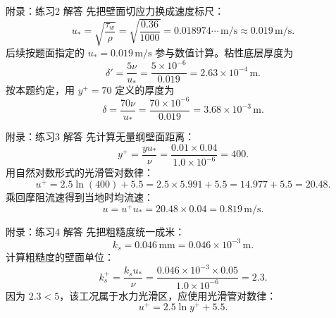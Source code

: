 \documentclass[aspectratio=169,10pt]{beamer}
\begin{document}
\begin{frame}{附录：练习2 解答}
  \label{A2}
  \footnotesize
  先把壁面切应力换成速度标尺：
  \[
    u_*=\sqrt{\frac{\tau_w}{\rho}}
    =\sqrt{\frac{0.36}{1000}}
    =0.018974\cdots\,\mathrm{m/s}
    \approx0.019\,\mathrm{m/s}.
    \tag{R49}
  \]
  后续按题面指定的 $u_*=0.019\,\mathrm{m/s}$ 参与数值计算。粘性底层厚度为
  \[
    \delta'=\frac{5\nu}{u_*}
    =\frac{5\times10^{-6}}{0.019}
    =2.63\times10^{-4}\,\mathrm m .
    \tag{R50}
  \]
  按本题约定，用 $y^+=70$ 定义的厚度为
  \[
    \delta=\frac{70\nu}{u_*}
    =\frac{70\times10^{-6}}{0.019}
    =3.68\times10^{-3}\,\mathrm m .
    \tag{R51}
  \]
\end{frame}

\begin{frame}{附录：练习3 解答}
  \label{A3}
  \footnotesize
  先计算无量纲壁面距离：
  \[
    y^+=\frac{yu_*}{\nu}
    =\frac{0.01\times0.04}{1.0\times10^{-6}}
    =400 .
    \tag{R52}
  \]
  用自然对数形式的光滑管对数律：
  \[
    u^+=2.5\ln(400)+5.5
    =2.5\times5.991+5.5
    =14.977+5.5
    =20.48 .
    \tag{R53}
  \]
  乘回摩阻流速得到当地时均流速：
  \[
    u=u^+u_*
    =20.48\times0.04
    =0.819\,\mathrm{m/s}.
    \tag{R54}
  \]
\end{frame}

\begin{frame}{附录：练习4 解答}
  \label{A4}
  \footnotesize
  先把粗糙度统一成米：
  \[
    k_s=0.046\,\mathrm{mm}=0.046\times10^{-3}\,\mathrm m .
    \tag{R55}
  \]
  计算粗糙度的壁面单位：
  \[
    k_s^+=\frac{k_su_*}{\nu}
    =\frac{0.046\times10^{-3}\times0.05}{1.0\times10^{-6}}
    =2.3 .
    \tag{R56}
  \]
  因为 $2.3<5$，该工况属于水力光滑区，应使用光滑管对数律：
  \[
    u^+=2.5\ln y^+ +5.5 .
    \tag{R57}
  \]
\end{frame}
\end{document}
